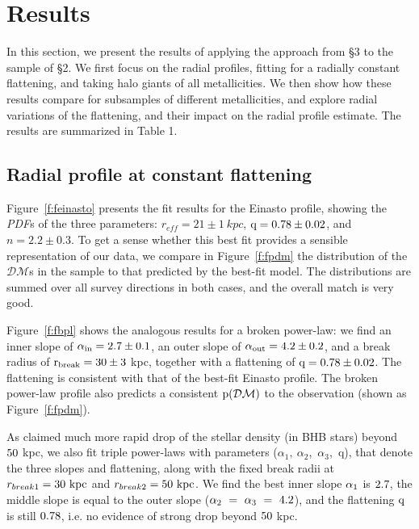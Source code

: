 \documentclass[12pt,preprint]{aastex}
\newcommand{\DM}{\mathcal{DM}}
\begin{document}
\section{Results}\label{sec:Results}
In this section, we present the results of applying the approach from \S 3 to the sample of \S 2.  
We first focus on the radial profiles, fitting for a radially constant flattening, and taking halo giants of all metallicities. We then show how these results compare for subsamples of different metallicities, and explore radial variations of the flattening, and their impact on the radial profile estimate. The results are summarized in Table 1. 

\subsection{Radial profile at constant flattening}\label{sec:Results_RadialProfile}

Figure~\ref{f:feinasto} presents the fit results for the Einasto profile,  showing the \textit{PDF}s of the three parameters: $r_{eff}=21\pm1~kpc$, $\rm q=0.78\pm0.02$, and $n=2.2\pm0.3$.
To get a sense whether this best fit provides a sensible representation of our data, we compare
 in Figure~\ref{f:fpdm} the distribution of the $\DM$s in the sample to that predicted by the best-fit model. The distributions are summed over all survey directions in both cases, and the overall match is very good. 

Figure~\ref{f:fbpl} shows the analogous results for a broken power-law: we find an inner slope of $\rm \alpha_{in}=2.7\pm0.1$, an outer slope of $\rm \alpha_{out}=4.2\pm0.2$, and a break radius of
 $\rm r_{break}=30\pm3~$kpc, together with a flattening of $\rm q=0.78\pm0.02$. The flattening is consistent with that of the best-fit Einasto profile. The broken power-law profile also predicts a consistent $\rm p(\DM)$ to the observation (shown as Figure~\ref{f:fpdm}).
 
As \citet{Deason2014} claimed much more rapid drop of the stellar density (in BHB stars) beyond $\rm 50~$kpc, we also fit triple power-laws with parameters  ($\alpha_{1},~\alpha_{2}$,~$\alpha_{3}$,~q), that denote the three slopes and flattening, along with the fixed break radii at $r_{break1}=\rm 30~kpc$ and $r_{break2}=\rm 50~kpc$. We find the best inner slope $\rm \alpha_{1}$ is $\rm 2.7$, the middle slope is equal to the outer slope ($\rm \alpha_{2}~=~ \alpha_{3}~=~4.2$), and the flattening $\rm q$ is still $\rm 0.78$, i.e. no evidence of strong drop beyond $\rm 50~$kpc.
\end{document}
